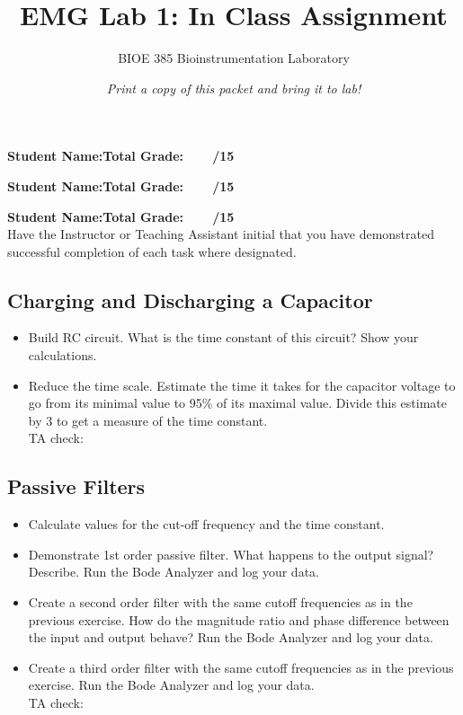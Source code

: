 \documentclass{article}
\title{EMG Lab 1: In Class Assignment}
\author{BIOE 385 Bioinstrumentation Laboratory}
\date{\textit{Print a copy of this packet and bring it to lab!}}
\begin{document}
\large
\maketitle

\textbf{Student Name:}\hfill 	\textbf{Total Grade:\ \ \ \ /15}\vspace{0.5cm}

\textbf{Student Name:}\hfill 	\textbf{Total Grade:\ \ \ \ /15}\vspace{0.5cm}

\textbf{Student Name:}\hfill 	\textbf{Total Grade:\ \ \ \ /15}\\

Have the Instructor or Teaching Assistant initial that you have demonstrated successful completion of each task where designated.

\subsection*{Charging and Discharging a Capacitor}
\begin{itemize}
	\item Build RC circuit. What is the time constant of this circuit? Show your calculations.\vspace{3cm}

	\item Reduce the time scale. Estimate the time it takes for the capacitor voltage to go from its minimal value to 95\% of its maximal value. Divide this estimate by 3 to get a measure of the time constant.\vspace{3cm}\\TA check: \underline{\hspace{2cm}}
\end{itemize}

\subsection*{Passive Filters}
\begin{itemize}
	\item Calculate values for the cut-off frequency and the time constant.\vspace{3cm}
	\item Demonstrate 1st order passive filter. What happens to the output signal? Describe. Run the Bode Analyzer and log your data.\vspace{3cm}
	\item Create a second order filter with the same cutoff frequencies as in the previous exercise. How do the magnitude ratio and phase difference between the input and output behave? Run the Bode Analyzer and log your data.\vspace{3cm}
	\item Create a third order filter with the same cutoff frequencies as in the previous exercise. Run the Bode Analyzer and log your data.\vspace{3cm}\\TA check: \underline{\hspace{2cm}}
\end{itemize}
\end{document}
